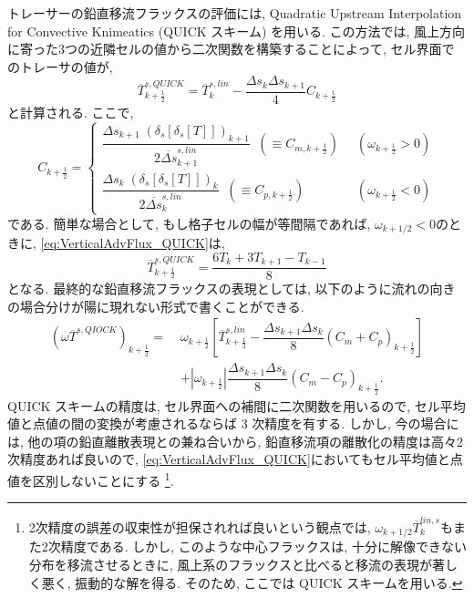 トレーサーの鉛直移流フラックスの評価には, Quadratic Upstream Interpolation for Convective
Knimeatics (QUICK スキーム) \citep{leonard1979stable}を用いる.
この方法では, 風上方向に寄った3つの近隣セルの値から二次関数を構築することによって,  
セル界面でのトレーサの値が,  
\begin{equation}
  \overline{T}^{s,QUICK}_{k+\frac{1}{2}}
  = \overline{T}^{s,lin}_k
  -     \dfrac{\Delta s_k \Delta s_{k+1}}{4} C_{k+\frac{1}{2}}
\label{eq:VerticalAdvFlux_QUICK}
\end{equation}
と計算される. 
ここで, 
\begin{equation*}
  C_{k+\frac{1}{2}} = \begin{cases}
    \dfrac{\Delta s_{k+1} \; (\delta_s[\delta_s [T]])_{k+1}} 
          {2 \overline{\Delta s}^{s,lin}_{k+1}} \;\;
          (\equiv C_{m,k+\frac{1}{2}}) 
          &\;\;(\omega_{k+\frac{1}{2}} > 0) \\[12pt]
    \dfrac{\Delta s_{k} \; (\delta_s[\delta_s [T]])_{k}}
    {2 \overline{\Delta s}^{s,lin}_k} \;\;
    (\equiv C_{p,k+\frac{1}{2}})
    &\;\;(\omega_{k+\frac{1}{2}} < 0) 
   \end{cases} 
\end{equation*}
である. 
簡単な場合として, もし格子セルの幅が等間隔であれば, $\omega_{k+1/2}<0$のときに, 
\eqref{eq:VerticalAdvFlux_QUICK}は, 
$$
 \overline{T}^{s,QUICK}_{k+\frac{1}{2}} = \dfrac{6T_{k} + 3T_{k+1} - T_{k-1}}{8}
$$
となる. 
最終的な鉛直移流フラックスの表現としては,  以下のように流れの向きの場合分けが陽に現れない形式で書くことができる. 
\begin{align}
  (\omega \overline{T}^{s,QIOCK})_{k+\frac{1}{2}}
  =\; &\omega_{k+\frac{1}{2}} \left[ 
      \overline{T}^{s,lin}_{k+\frac{1}{2}}
    - \dfrac{\Delta s_{k+1} \Delta s_{k}}{8} (C_m + C_p)_{k+\frac{1}{2}} 
    \right]  \nonumber \\
   &+ \left|\omega_{k+\frac{1}{2}}\right| \dfrac{\Delta s_{k+1} \Delta s_{k}}{8}
      (C_m - C_p)_{k+\frac{1}{2}}. 
\end{align}
QUICK スキームの精度は, セル界面への補間に二次関数を用いるので, 
セル平均値と点値の間の変換が考慮されるならば 3 次精度を有する. 
しかし, 今の場合には, 他の項の鉛直離散表現との兼ね合いから, 鉛直移流項の離散化の精度は高々2次精度あれば良いので,  
\eqref{eq:VerticalAdvFlux_QUICK}においてもセル平均値と点値を区別しないことにする%
\footnote{
2次精度の誤差の収束性が担保されれば良いという観点では,
$\omega_{k+1/2}\overline{T}^{lin,s}_k$もまた2次精度である.  
しかし, このような中心フラックスは, 十分に解像できない分布を移流させるときに, 
風上系のフラックスと比べると移流の表現が著しく悪く, 振動的な解を得る. 
そのため, ここでは QUICK スキームを用いる. 
}.  

